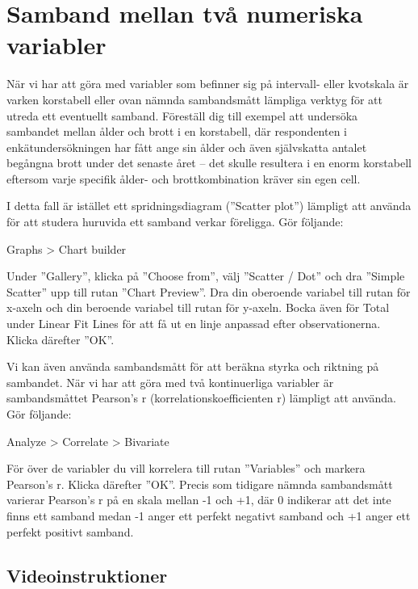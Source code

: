 \documentclass[
]{book}
\begin{document}
\hypertarget{samband-mellan-tvuxe5-numeriska-variabler}{%
\section{Samband mellan två numeriska variabler}\label{samband-mellan-tvuxe5-numeriska-variabler}}

När vi har att göra med variabler som befinner sig på intervall- eller kvotskala är varken korstabell eller
ovan nämnda sambandsmått lämpliga verktyg för att utreda ett eventuellt samband. Föreställ dig till
exempel att undersöka sambandet mellan ålder och brott i en korstabell, där respondenten i
enkätundersökningen har fått ange sin ålder och även självskatta antalet begångna brott under det
senaste året -- det skulle resultera i en enorm korstabell eftersom varje specifik ålder- och
brottkombination kräver sin egen cell.

I detta fall är istället ett spridningsdiagram (''Scatter plot'') lämpligt att använda för att studera huruvida
ett samband verkar föreligga. Gör följande:

Graphs \textgreater{} Chart builder

Under ''Gallery'', klicka på ''Choose from'', välj ''Scatter / Dot'' och dra ''Simple Scatter'' upp till rutan
''Chart Preview''. Dra din oberoende variabel till rutan för x-axeln och din beroende variabel till rutan för
y-axeln. Bocka även för Total under Linear Fit Lines för att få ut en linje anpassad efter observationerna. Klicka därefter ''OK''.

Vi kan även använda sambandsmått för att beräkna styrka och riktning på sambandet. När vi har att
göra med två kontinuerliga variabler är sambandsmåttet Pearson's r (korrelationskoefficienten r)
lämpligt att använda. Gör följande:

Analyze \textgreater{} Correlate \textgreater{} Bivariate

För över de variabler du vill korrelera till rutan ''Variables'' och markera Pearson's r. Klicka därefter
''OK''. Precis som tidigare nämnda sambandsmått varierar Pearson's r på en skala mellan -1 och +1, där
0 indikerar att det inte finns ett samband medan -1 anger ett perfekt negativt samband och +1 anger ett
perfekt positivt samband.

\hypertarget{videoinstruktioner-7}{%
\subsection{Videoinstruktioner}\label{videoinstruktioner-7}}
\end{document}
